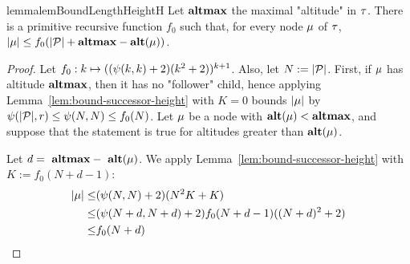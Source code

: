 \begin{restatable}{lemma}{lemBoundLengthHeightH}
	\label{lem:bound-length-at-height-h}
	Let $\mathbf{altmax}$ the maximal "altitude" in $\tau$. There is a primitive recursive function $f_0$ such that, for every node $\mu$ of $\tau$, $|\mu| \leq f_0(|\mathcal{P}| + \mathbf{altmax} - \mathbf{alt}(\mu))$.
\end{restatable}
\begin{proof}
Let $f_0: k \mapsto ((\psi(k,k)+2) (k^2 +2))^{k+1}$. Also, let $N := |\mathcal{P}|$.
First, if $\mu$ has altitude $\mathbf{altmax}$, then it has no "follower" child, hence applying Lemma~\ref{lem:bound-successor-height} with $K=0$ bounds $|\mu|$ by $\psi(|\mathcal{P}|,r) \leq \psi(N,N) \leq f_0(N)$. Let $\mu$ be a node with $\mathbf{alt}(\mu) < \mathbf{altmax}$, and suppose that the statement is true for altitudes greater than $\mathbf{alt}(\mu)$. ~

Let $d =~\mathbf{altmax} - ~\mathbf{alt}(\mu)$. We apply Lemma~\ref{lem:bound-successor-height} with $K := f_0(N + d - 1)$: 
\begin{align*}
|\mu| \leq & (\psi(N,N)+2) (N^2 K + K)\\ \leq & (\psi(N+d,N+d)+2) f_0(N+d-1) ((N+d)^2 +2)   \\ \leq & f_0(N+d) 
\end{align*}
\end{proof}

	
		

